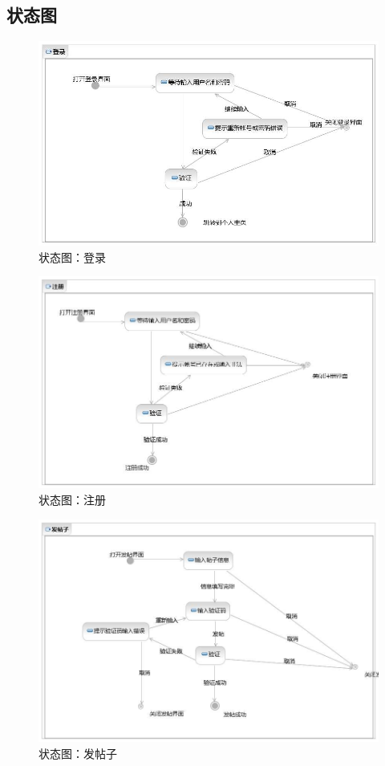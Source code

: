 \documentclass[a4paper,14pt]{ctexart}
\begin{document}
\subsection{状态图}

\begin{figure}[H]
\centering\includegraphics[width=4.5in]{状态图-登录.jpeg}
\caption{状态图：登录}
\end{figure}

\begin{figure}[H]
\centering\includegraphics[width=4.5in]{状态图-注册.jpeg}
\caption{状态图：注册}
\end{figure}

\begin{figure}[H]
\centering\includegraphics[width=4.5in]{状态图-发帖子.jpeg}
\caption{状态图：发帖子}
\end{figure}
\end{document}
